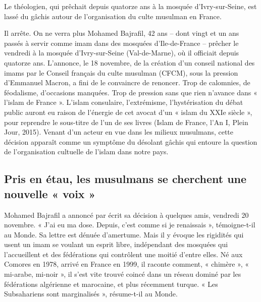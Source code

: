 Le théologien, qui prêchait depuis quatorze ans à la mosquée d’Ivry-sur-Seine, est lassé du gâchis autour de l’organisation du culte musulman en France. 

Il arrête. On ne verra plus Mohamed Bajrafil, 42 ans – dont vingt et un ans passés à servir comme imam dans des mosquées d’Ile-de-France – prêcher le vendredi à la mosquée d’Ivry-sur-Seine (Val-de-Marne), où il officiait depuis quatorze ans. L’annonce, le 18 novembre, de la création d’un conseil national des imams par le Conseil français du culte musulman (CFCM), sous la pression d’Emmanuel Macron, a fini de le convaincre de renoncer.
Trop de calomnies, de féodalisme, d’occasions manquées. Trop de pression sans que rien n’avance dans « l’islam de France ». L’islam consulaire, l’extrémisme, l’hystérisation du débat public auront eu raison de l’énergie de cet avocat d’un « islam du XXIe siècle », pour reprendre le sous-titre de l’un de ses livres (Islam de France, l’An I, Plein Jour, 2015). Venant d’un acteur en vue dans les milieux musulmans, cette décision apparaît comme un symptôme du désolant gâchis qui entoure la question de l’organisation cultuelle de l’islam dans notre pays.
\subsection*{Pris en étau, les musulmans se cherchent une nouvelle « voix » }
Mohamed Bajrafil a annoncé par écrit sa décision à quelques amis, vendredi 20 novembre. « J’ai eu ma dose. Depuis, c’est comme si je renaissais », témoigne-t-il au Monde. Sa lettre est dénuée d’amertume. Mais il y évoque les rigidités qui usent un imam se voulant un esprit libre, indépendant des mosquées qui l’accueillent et des fédérations qui contrôlent une moitié d’entre elles. Né aux Comores en 1978, arrivé en France en 1999, il raconte comment, « chimère », « mi-arabe, mi-noir », il s’est vite trouvé coincé dans un réseau dominé par les fédérations algérienne et marocaine, et plus récemment turque. « Les Subsahariens sont marginalisés », résume-t-il au Monde.

